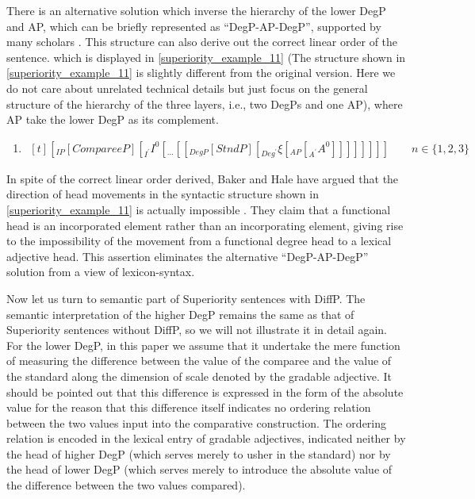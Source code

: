 \documentclass{ctexart}
\let \cite \parencite
\begin{document}
There is an alternative solution which inverse the hierarchy of the lower DegP and AP, which can be briefly represented as ``DegP-AP-DegP'', supported by many scholars \cite{xiang2005,grano2012}. This structure can also derive out the correct linear order of the sentence. which is displayed in \ref{superiority_example_11} (The structure shown in \ref{superiority_example_11} is slightly different from the original version. Here we do not care about unrelated technical details but just focus on the general structure of the hierarchy of the three layers, i.e., two DegPs and one AP), where AP take the lower DegP as its complement.

\begin{enumerate}
    \item \label{superiority_example_11}
    $\begin{aligned}[t]
        [_{IP} [CompareeP] [_{I^{\prime}} I^{0} [_{...} [[_{DegP} [StndP] [_{Deg^{\prime}} \xi [_{AP} [_{A^{\prime}} A^{0}]]]]]]]] \qquad n \in \{1, 2, 3\}
    \end{aligned}$
\end{enumerate}

In spite of the correct linear order derived, Baker and Hale have argued that the direction of head movements in the syntactic structure shown in \ref{superiority_example_11} is actually impossible \cite{baker1988incorporation,hale1993argument}. They claim that a functional head is an incorporated element rather than an incorporating element, giving rise to the impossibility of the movement from a functional degree head to a lexical adjective head. This assertion eliminates the alternative ``DegP-AP-DegP'' solution from a view of lexicon-syntax.

Now let us turn to semantic part of Superiority sentences with DiffP. The semantic interpretation of the higher DegP remains the same as that of Superiority sentences without DiffP, so we will not illustrate it in detail again. For the lower DegP, in this paper we assume that it undertake the mere function of measuring the difference between the value of the comparee and the value of  the standard along the dimension of scale denoted by the gradable adjective. It should be pointed out that this difference is expressed in the form of the absolute value for the reason that this difference itself indicates no ordering relation between the two values input into the comparative construction.  The ordering relation is encoded in the lexical entry of gradable adjectives,  indicated neither by the head of higher DegP (which serves merely to usher in the standard) nor by the head of lower DegP (which serves merely to introduce the absolute value of the difference between the two values compared). 
\end{document}

